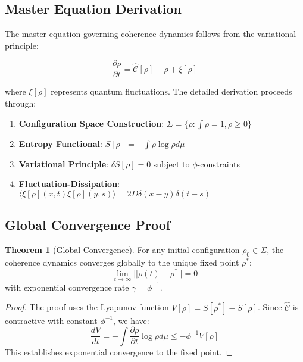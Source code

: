 \documentclass[11pt]{article}
\theoremstyle{definition}
\newtheorem{theorem}{Theorem}[section]
\newcommand{\goldenratio}{\phi}
\newcommand{\coherence}{\mathcal{C}}
\newcommand{\configspace}{\Sigma}
\newcommand{\density}{\rho}
\newcommand{\entropy}{S}
\begin{document}
\subsection{Master Equation Derivation}

The master equation governing coherence dynamics follows from the variational principle:

\begin{equation}
\frac{\partial \density}{\partial t} = \hat{\coherence}[\density] - \density + \xi[\density]
\end{equation}

where $\xi[\density]$ represents quantum fluctuations. The detailed derivation proceeds through:

\begin{enumerate}
\item \textbf{Configuration Space Construction}: $\configspace = \{\density: \int \density = 1, \density \geq 0\}$
\item \textbf{Entropy Functional}: $\entropy[\density] = -\int \density \log \density d\mu$
\item \textbf{Variational Principle}: $\delta \entropy[\density] = 0$ subject to $\goldenratio$-constraints
\item \textbf{Fluctuation-Dissipation}: $\langle \xi[\density](x,t) \xi[\density](y,s) \rangle = 2D\delta(x-y)\delta(t-s)$
\end{enumerate}

\subsection{Global Convergence Proof}

\begin{theorem}[Global Convergence]
For any initial configuration $\density_0 \in \configspace$, the coherence dynamics converges globally to the unique fixed point $\density^*$:
\begin{equation}
\lim_{t \to \infty} ||\density(t) - \density^*|| = 0
\end{equation}
with exponential convergence rate $\gamma = \goldenratio^{-1}$.
\end{theorem}

\begin{proof}
The proof uses the Lyapunov function $V[\density] = \entropy[\density^*] - \entropy[\density]$. Since $\hat{\coherence}$ is contractive with constant $\goldenratio^{-1}$, we have:
\begin{equation}
\frac{dV}{dt} = -\int \frac{\partial \density}{\partial t} \log \density d\mu \leq -\goldenratio^{-1} V[\density]
\end{equation}
This establishes exponential convergence to the fixed point.
\end{proof}
\end{document}
